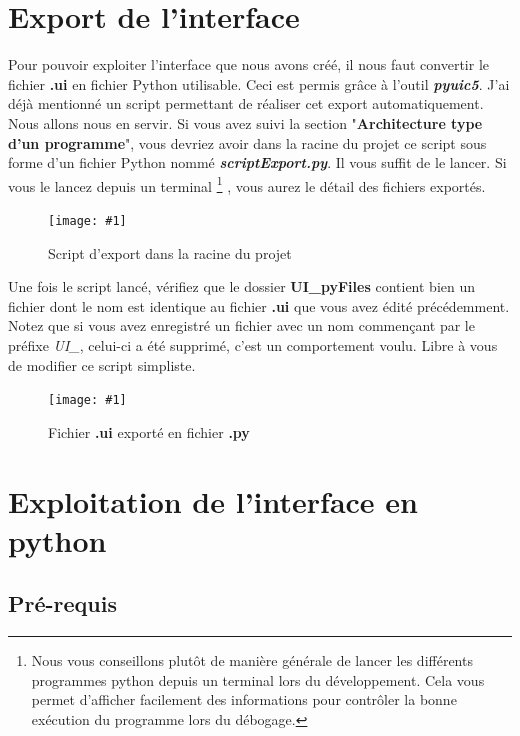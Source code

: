 \documentclass[12pt]{report}    %
\newcommand{\iImage}[3]{\begin{figure}[H]\centering\texttt{[image: \#1]}\caption{#2}\end{figure}}
\newcommand{\bold}[1]{{\bfseries #1}}
\newcommand{\italic}[1]{{\itshape #1}}
\newcommand{\rootIm}{images/ENIBSupervision/}
\begin{document}

\section{Export de l'interface}

Pour pouvoir exploiter l'interface que nous avons créé, il nous faut convertir le fichier \bold{*.ui} en fichier Python utilisable.\newline
Ceci est permis grâce à l'outil \italic{\bold{pyuic5}}.\newline
J'ai déjà mentionné un script permettant de réaliser cet export automatiquement. Nous allons nous en servir. Si vous avez suivi la section "\bold{Architecture type d'un programme}", vous devriez avoir dans la racine du projet ce script sous forme d'un fichier Python nommé \italic{\bold{scriptExport.py}}. Il vous suffit de le lancer. Si vous le lancez depuis un terminal
\footnote
{
Nous vous conseillons plutôt de manière générale de lancer les différents programmes python depuis un terminal lors du développement. Cela vous permet d'afficher facilement des informations pour contrôler la bonne exécution du programme lors du débogage.
}
, vous aurez le détail des fichiers exportés.\newline

\iImage{\rootIm enibSup_window_explorer_projectRoot_scriptExport.png}{Script d'export dans la racine du projet}{0.4}

Une fois le script lancé, vérifiez que le dossier \bold{UI\_pyFiles} contient bien un fichier dont le nom est identique au fichier \bold{*.ui} que vous avez édité précédemment. Notez que si vous avez enregistré un fichier avec un nom commençant par le préfixe \italic{UI\_}, celui-ci a été supprimé, c'est un comportement voulu. Libre à vous de modifier ce script simpliste.

\iImage{\rootIm enibSup_window_explorer_UIPyFiles_mainWindow.png}{Fichier \bold{*.ui} exporté en fichier \bold{*.py}}{0.4}


\section{Exploitation de l'interface en python}

\subsection{Pré-requis}
\end{document}
